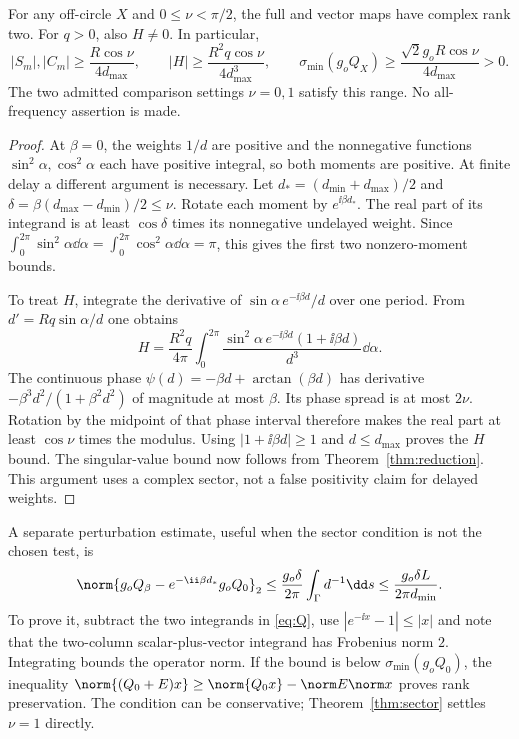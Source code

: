 \begin{theorem}\label{thm:sector}
For any off-circle $X$ and $0\le\nu<\pi/2$, the full and vector maps have complex rank two. For $q>0$, also $H\ne0$. In particular,
\begin{equation}\label{eq:sectorbound}
 |S_m|,|C_m|\ge\frac{R\cos\nu}{4d_{\max}},\qquad
 |H|\ge\frac{R^2q\cos\nu}{4d_{\max}^3},\qquad
 \sigma_{\min}(g_oQ_X)\ge\frac{\sqrt2g_oR\cos\nu}{4d_{\max}}>0.
\end{equation}
The two admitted comparison settings $\nu=0,1$ satisfy this range. No all-frequency assertion is made.
\end{theorem}
\begin{proof}
At $\beta=0$, the weights $1/d$ are positive and the nonnegative functions $\sin^2\alpha,\cos^2\alpha$ each have positive integral, so both moments are positive. At finite delay a different argument is necessary. Let $d_*=(d_{\min}+d_{\max})/2$ and $\delta=\beta(d_{\max}-d_{\min})/2\le\nu$. Rotate each moment by $e^{\ii\beta d_*}$. The real part of its integrand is at least $\cos\delta$ times its nonnegative undelayed weight. Since $\int_0^{2\pi}\sin^2\alpha\dd\alpha=\int_0^{2\pi}\cos^2\alpha\dd\alpha=\pi$, this gives the first two nonzero-moment bounds.

To treat $H$, integrate the derivative of $\sin\alpha\,e^{-\ii\beta d}/d$ over one period. From $d'=Rq\sin\alpha/d$ one obtains
\begin{equation}\label{eq:Hparts}
 H=\frac{R^2q}{4\pi}\int_0^{2\pi}
 \frac{\sin^2\alpha\,e^{-\ii\beta d}(1+\ii\beta d)}{d^3}\dd\alpha.
\end{equation}
The continuous phase $\psi(d)=-\beta d+\arctan(\beta d)$ has derivative
$-\beta^3d^2/(1+\beta^2d^2)$ of magnitude at most $\beta$. Its phase spread is at most $2\nu$. Rotation by the midpoint of that phase interval therefore makes the real part at least $\cos\nu$ times the modulus. Using $|1+\ii\beta d|\ge1$ and $d\le d_{\max}$ proves the $H$ bound. The singular-value bound now follows from Theorem~\ref{thm:reduction}. This argument uses a complex sector, not a false positivity claim for delayed weights.
\end{proof}

A separate perturbation estimate, useful when the sector condition is not the chosen test, is
\begin{equation}\label{eq:perturb}
 \norm{g_oQ_\beta-e^{-\ii\beta d_*}g_oQ_0}_2
 \le\frac{g_o\delta}{2\pi}\int_\Gamma d^{-1}\dd s
 \le\frac{g_o\delta L}{2\pi d_{\min}}.
\end{equation}
To prove it, subtract the two integrands in \eqref{eq:Q}, use $|e^{-\ii x}-1|\le|x|$ and note that the two-column scalar-plus-vector integrand has Frobenius norm $2$. Integrating bounds the operator norm. If the bound is below $\sigma_{\min}(g_oQ_0)$, the inequality $\norm{(Q_0+E)x}\ge\norm{Q_0x}-\norm E\norm x$ proves rank preservation. The condition can be conservative; Theorem~\ref{thm:sector} settles $\nu=1$ directly.

